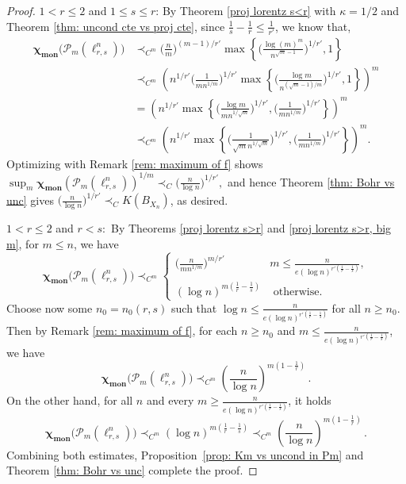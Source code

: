\documentclass[12pt]{amsart}
\numberwithin{subsection}{section}
\theoremstyle{definition}
\theoremstyle{remark}
\newcommand{\dis}{\displaystyle}
\DeclareMathOperator{\mon}{mon}
\newcommand{\chimon}{\chi_{\mon}}
\newcommand{\Pp}{\mathcal{P}}
\begin{document}
\begin{proof}
\noindent
$1 < r \le 2$ and $1 \le s \le r$: By  Theorem \ref{proj lorentz s<r} with $\kappa = 1/2$ and Theorem \ref{thm: uncond cte vs proj cte},
since $\frac{1}{s}-\frac{1}{r}\leq\frac{1}{r'}$, we know that,
\begin{align*}
\boldsymbol{\chimon}\big(\mathcal P_m( \ell_{r,s}^n)\big) & \prec_{C^m} \Big(\frac{n}{m} \Big)^{(m-1)/r'} \max \left\{ \Big( \frac{  \log(m)^{m}}{n^{\sqrt{m}-1}}\Big)^{1/r'},1 \right\} \\
& \prec_{C^m} \left( n^{1/r'}\Big(\frac{1}{mn^{1/m}} \Big)^{1/r'}\max \left\{ \Big(\frac{\log m}{n^{(\sqrt{m}-1)/m}}\Big)^{1/r'},1 \right\} \right)^m\\
& = \left( n^{1/r'}\max \left\{\Big(\frac{\log m}{mn^{1/\sqrt{m}}} \Big)^{1/r'},\Big(\frac{1}{mn^{1/m}} \Big)^{1/r'}\right\}\right)^m\\
&\prec_{C^m} \left( n^{1/r'}\max\left\{\Big(\frac{1}{\sqrt{m}n^{1/\sqrt{m}}} \Big)^{1/r'},\Big(\frac{1}{mn^{1/m}} \Big)^{1/r'}\right\}\right)^m.
\end{align*}
Optimizing with  Remark \ref{rem: maximum of f}  shows
$
\dis\sup_{m}  \boldsymbol{\chimon}(\mathcal P_m( \ell_{r,s}^n))^{1/m} \prec_C \Big( \frac{n}{\log n} \Big)^{1/r'},
$
and hence Theorem \ref{thm: Bohr vs unc} gives
$
\Big( \frac{n}{\log n} \Big)^{1/r'} \prec_C K(B_{X_n})$, as desired.

\noindent $1 < r \le 2$ and $ r<s$: \,By Theorems \ref{proj lorentz s>r} and \ref{proj lorentz s>r, big m}, for $m \leq n$, we have
\[
\boldsymbol{\chimon}\big(\Pp_m(\ell^n_{r,s})\big) \prec_{C^m} \begin{cases}
 \Big( \frac{n}{m n^{1/m}} \Big)^{m/r'} & m\le  \frac{n}{e (\log n)^{r'(\frac{1}{r} - \frac{1}{s})}},\\
(\log n)^{m(\frac1{r}-\frac1{s})} & \textrm{ otherwise.}
\end{cases}
\]
Choose now some  $n_0 = n_0(r,s)$  such that $\log n \le \frac{n}{e (\log n)^{r'(\frac{1}{r} - \frac{1}{s})}}
$ for all $n \ge n_0$. Then by Remark \ref{rem: maximum of f}, for each $n \ge n_0$ and $ m
\le \frac{n}{e (\log n)^{r'(\frac{1}{r} - \frac{1}{s})}}$, we have
\[
\boldsymbol{\chimon}\big(\Pp_m(\ell^n_{r,s})\big) \prec_{C^m} \left( \frac{n}{\log n} \right)^{m(1 - \frac{1}{r})}\,.
\]
On the other hand, for all $n$ and every $ m \ge \frac{n}{e (\log n)^{r'(\frac{1}{r} - \frac{1}{s})}}$, it holds
\[
\boldsymbol{\chimon}\big(\Pp_m(\ell^n_{r,s})\big) \prec_{C^m} (\log n)^{m(\frac{1}{r} - \frac{1}{s})}
\prec_{C^m} \left( \frac{n}{\log n} \right)^{m(1 - \frac{1}{r})}\,.
\]
Combining both estimates, Proposition~\ref{prop: Km vs uncond in Pm} and Theorem \ref{thm: Bohr vs unc} complete the proof.
\end{proof}
\end{document}
